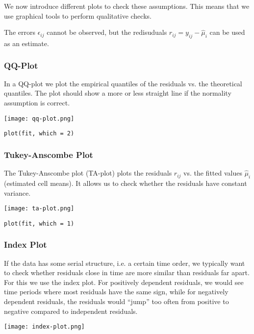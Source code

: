 We now introduce different plots to check these assumptions. This means that we use graphical tools to perform qualitative checks.\medskip

The errors $\epsilon_{ij}$ cannot be observed, but the redisuduals $r_{ij} = y_{ij} - \hat \mu_{i}$ can be used as an estimate.

\subsubsection{QQ-Plot}

In a QQ-plot we plot the empirical quantiles of the residuals vs. the theoretical quantiles. The plot should show a more or less straight line if the normality assumption is correct.
\\[-20pt]
\begin{center}
	\texttt{[image: qq-plot.png]}
\end{center}
\begin{lstlisting}
plot(fit, which = 2)
\end{lstlisting}

\subsubsection{Tukey-Anscombe Plot}

The Tukey-Anscombe plot (TA-plot) plots the residuals $r_{ij}$ vs. the fitted values $\hat \mu_i$ (estimated cell means). It allows us to check whether the residuals have constant variance.
\begin{center}
	\texttt{[image: ta-plot.png]}
\end{center}
\begin{lstlisting}
plot(fit, which = 1)
\end{lstlisting}

\subsubsection{Index Plot}

If the data has some serial structure, i.e. a certain time order, we typically want to check whether residuals close in time are more similar than residuals far apart. For this we use the index plot. For positively dependent residuals, we would see time periods where most residuals have the same sign, while for negatively dependent residuals, the residuals would “jump” too often from positive to negative compared to independent residuals. 
\begin{center}
	\texttt{[image: index-plot.png]}
\end{center}


